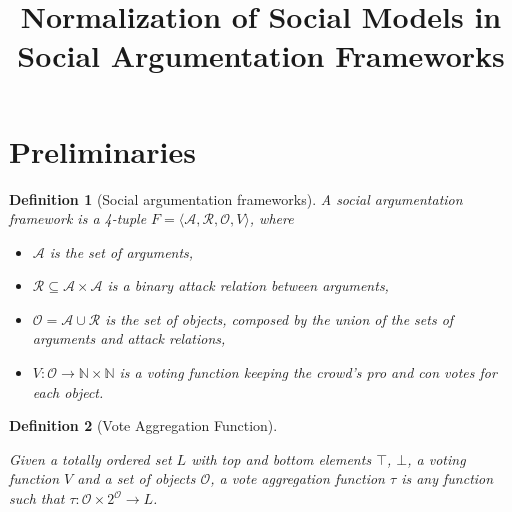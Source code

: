 \documentclass{article}
\date{ }
\newtheorem{definition}{Definition}
\newcommand{\nat}{\mathbb{N}}   %
\newcommand{\args}{\mathcal{A}} %
\newcommand{\att}{\mathcal{R}}  %
\newcommand{\valueset}{L}
\newcommand{\obj}{\mathcal{O}} %
\newcommand{\safid}{F}               %
\newcommand{\safbodyO}{\langle \args, \att, \obj, V \rangle} %
\newcommand{\safO}{\safid = \safbodyO} %
\begin{document}
\date{}
\title{Normalization of Social Models in Social Argumentation Frameworks}
\maketitle

\section{Preliminaries}


\begin{definition}[Social argumentation frameworks]
A \emph{social argumentation framework} is a 4-tuple $\safO$, where
\begin{itemize}
  \item $\args$ is the set of arguments,
  \item $\att \subseteq \args \times \args$ is a binary attack relation between arguments,
  \item $\obj = \args \cup \att$ is the set of objects, composed by the union of the sets of arguments and attack relations,
  \item $V : \obj \to \nat \times \nat$ is a voting function keeping the crowd's pro and con votes for each object.
\end{itemize}
\end{definition}

\begin{definition}[Vote Aggregation Function]
\label{def:voteAgg}

Given a totally ordered set $\valueset$ with top and bottom elements $\top$, $\bot$, a voting function $V$ and a set of objects $\obj$, a vote aggregation function $\tau$ is any function such that $\tau: \obj  \times {2}^{\obj} \to L$.
\end{definition}
\end{document}
